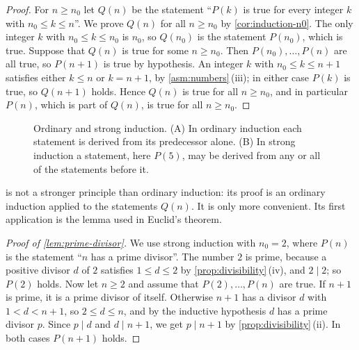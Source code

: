 \begin{proof}
For $n\ge n_0$ let $Q(n)$ be the statement ``$P(k)$ is true for every integer $k$ with $n_0\le k\le n$''. We prove $Q(n)$ for all $n\ge n_0$ by \cref{cor:induction-n0}. The only integer $k$ with $n_0\le k\le n_0$ is $n_0$, so $Q(n_0)$ is the statement $P(n_0)$, which is true. Suppose that $Q(n)$ is true for some $n\ge n_0$. Then $P(n_0),\ldots,P(n)$ are all true, so $P(n+1)$ is true by hypothesis. An integer $k$ with $n_0\le k\le n+1$ satisfies either $k\le n$ or $k=n+1$, by \cref{asm:numbers}\,(iii); in either case $P(k)$ is true, so $Q(n+1)$ holds. Hence $Q(n)$ is true for all $n\ge n_0$, and in particular $P(n)$, which is part of $Q(n)$, is true for all $n\ge n_0$.
\end{proof}

\begin{figure}
\sdpanelrow
{}
\caption{Ordinary and strong induction. (A) In ordinary induction each statement is derived from its predecessor alone. (B) In strong induction a statement, here $P(5)$, may be derived from any or all of the statements before it.}
\label{fig:strong}
\end{figure}

 is not a stronger principle than ordinary induction: its proof is an ordinary induction applied to the statements $Q(n)$. It is only more convenient. Its first application is the lemma used in Euclid's theorem.

\begin{proof}[Proof of \cref{lem:prime-divisor}]
We use strong induction with $n_0=2$, where $P(n)$ is the statement ``$n$ has a prime divisor''. The number $2$ is prime, because a positive divisor $d$ of $2$ satisfies $1\le d\le2$ by \cref{prop:divisibility}\,(iv), and $2\mid2$; so $P(2)$ holds. Now let $n\ge2$ and assume that $P(2),\ldots,P(n)$ are true. If $n+1$ is prime, it is a prime divisor of itself. Otherwise $n+1$ has a divisor $d$ with $1<d<n+1$, so $2\le d\le n$, and by the inductive hypothesis $d$ has a prime divisor $p$. Since $p\mid d$ and $d\mid n+1$, we get $p\mid n+1$ by \cref{prop:divisibility}\,(ii). In both cases $P(n+1)$ holds.
\end{proof}

